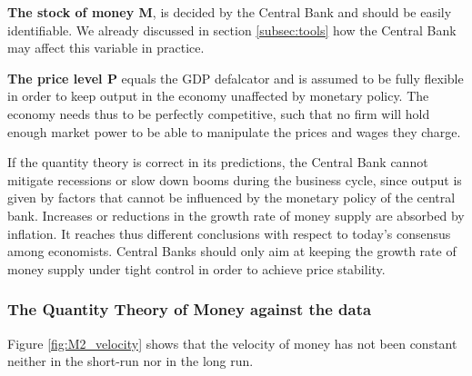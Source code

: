 \documentclass[11pt,a4paper,oneside]{book}
\begin{document}
\textbf{The stock of money M}, is decided by the Central Bank and should be easily identifiable. We already discussed in section \ref{subsec:tools} how the Central Bank may affect this variable in practice.

\textbf{The price level P} equals the GDP defalcator and is assumed to be fully flexible in order to keep output in the economy unaffected by monetary policy. The economy needs thus to be perfectly competitive, such that no firm will hold enough market power to be able to manipulate the prices and wages they charge.

If the quantity theory is correct in its predictions, the Central Bank cannot mitigate recessions or slow down booms during the business cycle, since output is given by factors that cannot be influenced by the monetary policy of the central bank. Increases or reductions in the growth rate of money supply are absorbed by inflation. It reaches thus different conclusions with respect to today's consensus among economists. Central Banks should only aim at keeping the growth rate of money supply under tight control in order to achieve price stability.

\subsubsection{The Quantity Theory of Money against the data}
\label{sec:quantity_theory_against_data}

Figure \ref{fig:M2_velocity} shows that the velocity of money has not been constant neither in the short-run nor in the long run.
\end{document}

